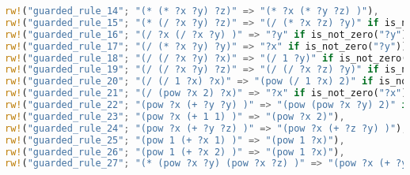 \begin{lstlisting}[language=Rust, caption={Rule set \ref{app:no_diff_int} with seperately completed rules for division.}, label={lst:no_diff_int_sep_div}]
rw!("guarded_rule_14"; "(* (* ?x ?y) ?z)" => "(* ?x (* ?y ?z) )"),
rw!("guarded_rule_15"; "(* (/ ?x ?y) ?z)" => "(/ (* ?x ?z) ?y)" if is_not_zero("?y")),
rw!("guarded_rule_16"; "(/ ?x (/ ?x ?y) )" => "?y" if is_not_zero("?y") if is_not_zero("?x")),
rw!("guarded_rule_17"; "(/ (* ?x ?y) ?y)" => "?x" if is_not_zero("?y")),
rw!("guarded_rule_18"; "(/ (/ ?x ?y) ?x)" => "(/ 1 ?y)" if is_not_zero("?x") if is_not_zero("?y")),
rw!("guarded_rule_19"; "(/ (/ ?x ?y) ?z)" => "(/ (/ ?x ?z) ?y)" if is_not_zero("?z") if is_not_zero("?y")),
rw!("guarded_rule_20"; "(/ (/ 1 ?x) ?x)" => "(pow (/ 1 ?x) 2)" if is_not_zero("?x")),
rw!("guarded_rule_21"; "(/ (pow ?x 2) ?x)" => "?x" if is_not_zero("?x")),
rw!("guarded_rule_22"; "(pow ?x (+ ?y ?y) )" => "(pow (pow ?x ?y) 2)" if is_not_zero("?x")),
rw!("guarded_rule_23"; "(pow ?x (+ 1 1) )" => "(pow ?x 2)"),
rw!("guarded_rule_24"; "(pow ?x (+ ?y ?z) )" => "(pow ?x (+ ?z ?y) )"),
rw!("guarded_rule_25"; "(pow 1 (+ ?x 1) )" => "(pow 1 ?x)"),
rw!("guarded_rule_26"; "(pow 1 (+ ?x 2) )" => "(pow 1 ?x)"),
rw!("guarded_rule_27"; "(* (pow ?x ?y) (pow ?x ?z) )" => "(pow ?x (+ ?y ?z) )" if is_not_zero("?x")),
\end{lstlisting}

\newpage
